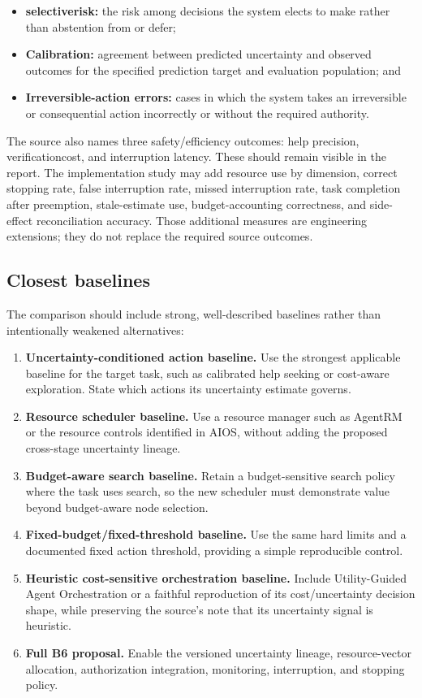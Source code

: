 \begin{itemize}
  \item \textbf{\gls{selectiverisk}:} the risk among decisions the system elects to make rather than \gls{abstention} from or defer;
  \item \textbf{Calibration:} agreement between predicted uncertainty and observed outcomes for the specified prediction target and evaluation population; and
  \item \textbf{Irreversible-action errors:} cases in which the system takes an irreversible or consequential action incorrectly or without the required authority.
\end{itemize}

The source also names three safety/efficiency outcomes: help precision, \gls{verificationcost}, and interruption latency. These should remain visible in the report. The implementation study may add resource use by dimension, correct stopping rate, false interruption rate, missed interruption rate, task completion after preemption, stale-estimate use, budget-accounting correctness, and side-effect reconciliation accuracy. Those additional measures are engineering extensions; they do not replace the required source outcomes.

\subsection{Closest baselines}
\label{sec:ch16-baselines}

The comparison should include strong, well-described baselines rather than intentionally weakened alternatives:

\begin{enumerate}
  \item \textbf{Uncertainty-conditioned action baseline.} Use the strongest applicable baseline for the target task, such as calibrated help seeking or cost-aware exploration. State which actions its uncertainty estimate governs.
  \item \textbf{Resource scheduler baseline.} Use a resource manager such as AgentRM or the resource controls identified in AIOS, without adding the proposed cross-stage uncertainty lineage.
  \item \textbf{Budget-aware search baseline.} Retain a budget-sensitive search policy where the task uses search, so the new scheduler must demonstrate value beyond budget-aware node selection.
  \item \textbf{Fixed-budget/fixed-threshold baseline.} Use the same hard limits and a documented fixed action threshold, providing a simple reproducible control.
  \item \textbf{Heuristic cost-sensitive orchestration baseline.} Include Utility-Guided Agent Orchestration or a faithful reproduction of its cost/uncertainty decision shape, while preserving the source's note that its uncertainty signal is heuristic.
  \item \textbf{Full B6 proposal.} Enable the versioned uncertainty lineage, resource-vector allocation, authorization integration, monitoring, interruption, and stopping policy.
\end{enumerate}

